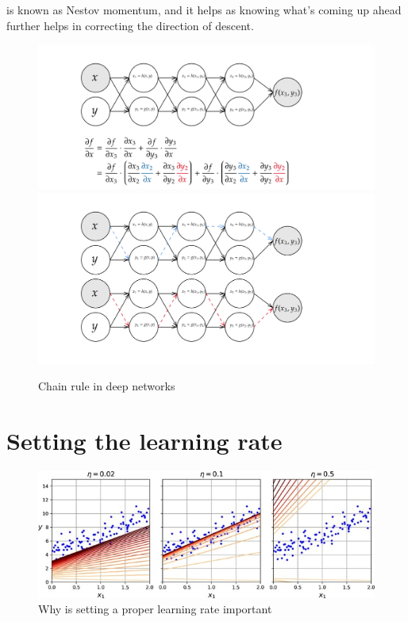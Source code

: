 is known as Nestov momentum, and it helps as knowing what's coming up ahead further helps
in correcting the direction of descent.
\begin{figure}
    \begin{center}
        \includegraphics[width=\textwidth]{graphics/revmodeautodiff.png}
        \includegraphics[width=\textwidth]{graphics/path comp.png}
    \end{center}
    \caption{Chain rule in deep networks}\label{path}
\end{figure}
\section{Setting the learning rate}
\begin{figure}
    \includegraphics[width=\textwidth]{graphics/learning rate.jpeg}
    \caption{Why is setting a proper learning rate important\citep{geron2022hands}}
\end{figure}
